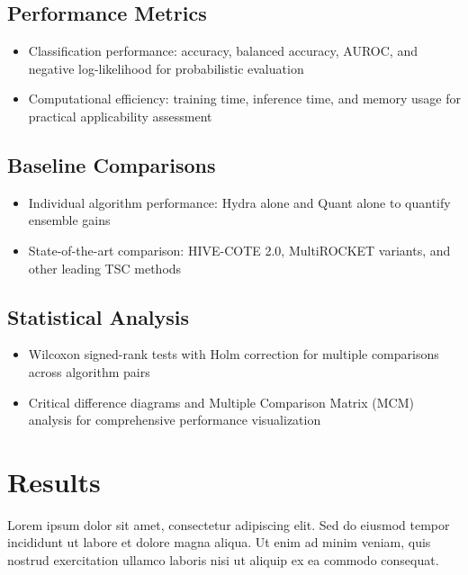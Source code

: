 \documentclass[pdflatex,sn-basic]{sn-jnl}           %
\theoremstyle{thmstyleone}%
\theoremstyle{thmstyletwo}%
\theoremstyle{thmstylethree}%
\begin{document}
\subsection{Performance Metrics}
\begin{itemize}
\item Classification performance: accuracy, balanced accuracy, AUROC, and negative log-likelihood for probabilistic evaluation
\item Computational efficiency: training time, inference time, and memory usage for practical applicability assessment
\end{itemize}

\subsection{Baseline Comparisons}
\begin{itemize}
\item Individual algorithm performance: Hydra alone and Quant alone to quantify ensemble gains
\item State-of-the-art comparison: HIVE-COTE 2.0, MultiROCKET variants, and other leading TSC methods
\end{itemize}

\subsection{Statistical Analysis}
\begin{itemize}
\item Wilcoxon signed-rank tests with Holm correction for multiple comparisons across algorithm pairs
\item Critical difference diagrams and Multiple Comparison Matrix (MCM) analysis for comprehensive performance visualization
\end{itemize}

\section{Results}\label{sec5}

Lorem ipsum dolor sit amet, consectetur adipiscing elit. Sed do eiusmod tempor incididunt ut labore et dolore magna aliqua. Ut enim ad minim veniam, quis nostrud exercitation ullamco laboris nisi ut aliquip ex ea commodo consequat.
\end{document}
